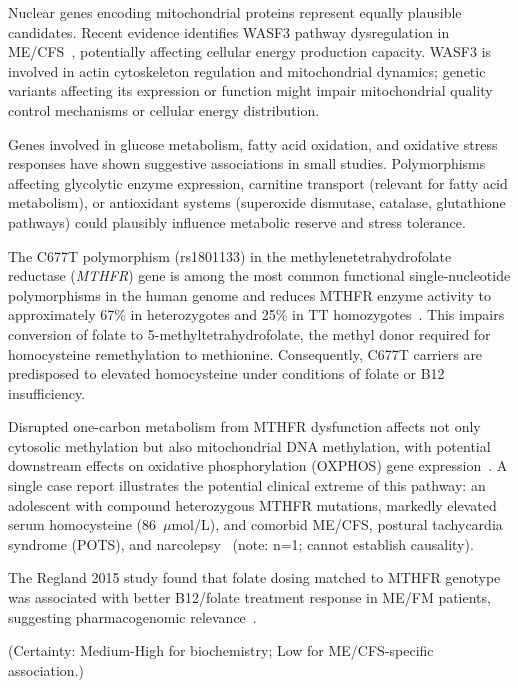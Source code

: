 Nuclear genes encoding mitochondrial proteins represent equally plausible candidates. Recent evidence identifies WASF3 pathway dysregulation in ME/CFS~\cite{Syed2025}, potentially affecting cellular energy production capacity. WASF3 is involved in actin cytoskeleton regulation and mitochondrial dynamics; genetic variants affecting its expression or function might impair mitochondrial quality control mechanisms or cellular energy distribution.

Genes involved in glucose metabolism, fatty acid oxidation, and oxidative stress responses have shown suggestive associations in small studies. Polymorphisms affecting glycolytic enzyme expression, carnitine transport (relevant for fatty acid metabolism), or antioxidant systems (superoxide dismutase, catalase, glutathione pathways) could plausibly influence metabolic reserve and stress tolerance.

\begin{observation}
\label{obs:mthfr-c677t-candidate}
The C677T polymorphism (rs1801133) in the methylenetetrahydrofolate reductase (\textit{MTHFR})
gene is among the most common functional single-nucleotide polymorphisms in the human genome and
reduces MTHFR enzyme activity to approximately 67\% in heterozygotes and 25\% in TT
homozygotes~\cite{Zarembska2023}. This impairs conversion of folate to 5-methyltetrahydrofolate,
the methyl donor required for homocysteine remethylation to methionine. Consequently, C677T
carriers are predisposed to elevated homocysteine under conditions of folate or B12 insufficiency.

Disrupted one-carbon metabolism from MTHFR dysfunction affects not only cytosolic methylation but
also mitochondrial DNA methylation, with potential downstream effects on oxidative phosphorylation
(OXPHOS) gene expression~\cite{Zarembska2023}. A single case report illustrates the potential
clinical extreme of this pathway: an adolescent with compound heterozygous MTHFR mutations,
markedly elevated serum homocysteine (86~$\mu$mol/L), and comorbid ME/CFS, postural tachycardia
syndrome (POTS), and narcolepsy~\cite{Liao2021} (note: n=1; cannot establish causality).

The Regland 2015 study found that folate dosing matched to MTHFR genotype was associated with
better B12/folate treatment response in ME/FM patients, suggesting pharmacogenomic
relevance~\cite{Regland2015}.

(Certainty: Medium-High for biochemistry; Low for ME/CFS-specific association.)
\end{observation}

